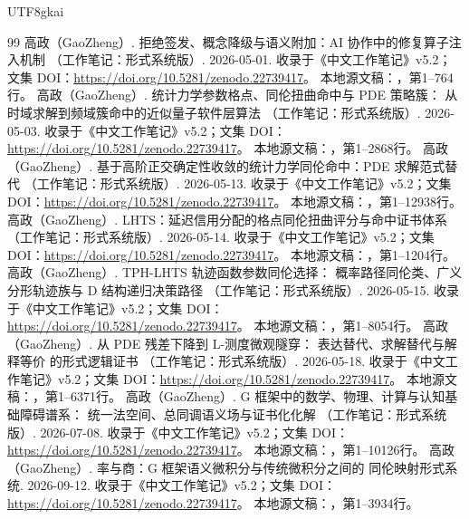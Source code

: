 \documentclass[11pt,a4paper]{article}
\theoremstyle{plain}
\theoremstyle{definition}
\theoremstyle{remark}
\begin{document}
\begin{CJK*}{UTF8}{gkai}
\begin{thebibliography}{99}
高政（GaoZheng）. 拒绝签发、概念降级与语义附加：AI 协作中的修复算子注入机制 （工作笔记：形式系统版）. 2026-05-01.
\newblock 收录于《中文工作笔记》v5.2；文集 DOI：\url{https://doi.org/10.5281/zenodo.22739417}。
\newblock 本地源文稿：，第1--764行。
高政（GaoZheng）. 统计力学参数格点、同伦扭曲命中与 PDE 策略簇： 从时域求解到频域簇命中的近似量子软件层算法 （工作笔记：形式系统版）. 2026-05-03.
\newblock 收录于《中文工作笔记》v5.2；文集 DOI：\url{https://doi.org/10.5281/zenodo.22739417}。
\newblock 本地源文稿：，第1--2868行。
高政（GaoZheng）. 基于高阶正交确定性收敛的统计力学同伦命中：PDE 求解范式替代 （工作笔记：形式系统版）. 2026-05-13.
\newblock 收录于《中文工作笔记》v5.2；文集 DOI：\url{https://doi.org/10.5281/zenodo.22739417}。
\newblock 本地源文稿：，第1--12938行。
高政（GaoZheng）. LHTS：延迟信用分配的格点同伦扭曲评分与命中证书体系 （工作笔记：形式系统版）. 2026-05-14.
\newblock 收录于《中文工作笔记》v5.2；文集 DOI：\url{https://doi.org/10.5281/zenodo.22739417}。
\newblock 本地源文稿：，第1--1204行。
高政（GaoZheng）. TPH-LHTS 轨迹函数参数同伦选择： 概率路径同伦类、广义分形轨迹族与 D 结构递归决策路径 （工作笔记：形式系统版）. 2026-05-15.
\newblock 收录于《中文工作笔记》v5.2；文集 DOI：\url{https://doi.org/10.5281/zenodo.22739417}。
\newblock 本地源文稿：，第1--8054行。
高政（GaoZheng）. 从 PDE 残差下降到 L-测度微观隧穿： 表达替代、求解替代与解释等价 的形式逻辑证书 （工作笔记：形式系统版）. 2026-05-18.
\newblock 收录于《中文工作笔记》v5.2；文集 DOI：\url{https://doi.org/10.5281/zenodo.22739417}。
\newblock 本地源文稿：，第1--6371行。
高政（GaoZheng）. G 框架中的数学、物理、计算与认知基础障碍谱系： 统一法空间、总同调语义场与证书化化解 （工作笔记：形式系统版）. 2026-07-08.
\newblock 收录于《中文工作笔记》v5.2；文集 DOI：\url{https://doi.org/10.5281/zenodo.22739417}。
\newblock 本地源文稿：，第1--10126行。
高政（GaoZheng）. 率与商：G 框架语义微积分与传统微积分之间的 同伦映射形式系统. 2026-09-12.
\newblock 收录于《中文工作笔记》v5.2；文集 DOI：\url{https://doi.org/10.5281/zenodo.22739417}。
\newblock 本地源文稿：，第1--3934行。
\end{thebibliography}
\clearpage
\end{CJK*}
\end{document}
